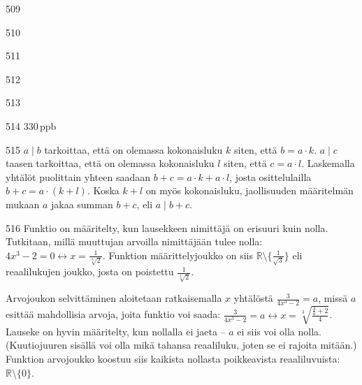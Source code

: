 \begin{Vastaus}{509}
	
\end{Vastaus}
\begin{Vastaus}{510}
	
\end{Vastaus}
\begin{Vastaus}{511}
	
\end{Vastaus}
\begin{Vastaus}{512}
	
\end{Vastaus}
\begin{Vastaus}{513}
	
\end{Vastaus}
\begin{Vastaus}{514}
	$330$\,ppb %
	
\end{Vastaus}
\begin{Vastaus}{515}
	$a	\mid b$ tarkoittaa, että on olemassa kokonaisluku $k$ siten, että $b=a\cdot k$. $a \mid c$ taasen tarkoittaa, että on olemassa kokonaisluku $l$ siten, että $c=a\cdot l$. Laskemalla yhtälöt puolittain yhteen saadaan $b+c=a\cdot k + a\cdot l$, josta osittelulailla $b+c=a\cdot (k+l)$. Koska $k+l$ on myös kokonaisluku, jaollisuuden määritelmän mukaan $a$ jakaa summan $b+c$, eli $a\mid b+c$.
	
\end{Vastaus}
\begin{Vastaus}{516}
Funktio on määritelty, kun lausekkeen nimittäjä on erisuuri kuin nolla. Tutkitaan, millä muuttujan arvoilla nimittäjään tulee nolla: $4x^3-2=0 \leftrightarrow x=\frac{1}{\sqrt[3]{2}}$. Funktion määrittelyjoukko on siis $\mathbb{R}\setminus\lbrace\frac{1}{\sqrt{3}} \rbrace$ eli reaalilukujen joukko, josta on poistettu $\frac{1}{\sqrt[3]{2}}$.

Arvojoukon selvittäminen aloitetaan ratkaisemalla $x$ yhtälöstä $\frac{3}{4x^3-2}=a$, missä $a$ esittää mahdollisia arvoja, joita funktio voi saada: $\frac{3}{4x^3-2}=a \leftrightarrow x= \sqrt[3]{\frac{\frac{3}{a}+2}{4}}$. Lauseke on hyvin määritelty, kun nollalla ei jaeta -- $a$ ei siis voi olla nolla. (Kuutiojuuren sisällä voi olla mikä tahansa reaaliluku, joten se ei rajoita mitään.) Funktion arvojoukko koostuu siis kaikista nollasta poikkeavista reaaliluvuista: $\mathbb{R}\setminus \lbrace 0 \rbrace$.
	
\end{Vastaus}
